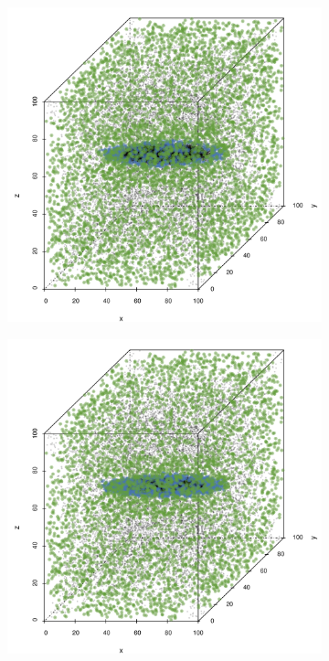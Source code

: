 \begin{figure}
\begin{subfigure}{0.23\textwidth}
					\includegraphics[keepaspectratio=true, width=\textwidth, height=0.23\textheight]{discussion/img/baakman_1_60000_anisotropy.png}
					\caption{}
					\label{fig:discussion:anisotropy:baakman1}
				\end{subfigure}	
				\begin{subfigure}{0.23\textwidth}
					\centering
					\includegraphics[keepaspectratio=true, width=\textwidth, height=0.23\textheight]{discussion/img/baakman_4_60000_anisotropy.png}

\end{subfigure}
\end{figure}
